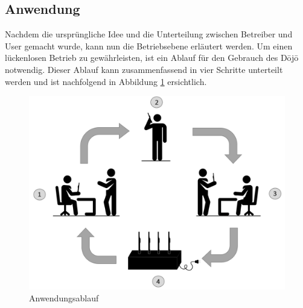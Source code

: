 \subsection{Anwendung}\label{sec:ladeablauf}
Nachdem die ursprüngliche Idee und die Unterteilung zwischen Betreiber und User gemacht wurde, kann nun die Betriebsebene erläutert werden.
Um einen lückenlosen Betrieb zu gewährleisten, ist ein Ablauf für den Gebrauch des Dōjō notwendig. Dieser Ablauf kann zusammenfassend in vier Schritte unterteilt werden und ist nachfolgend in Abbildung \ref{fig:Anwendungsablauf Dojo} ersichtlich.


\begin{figure}[H]
	\begin{center}
		\includegraphics[width=140mm]{data/Ladezyklus.png}
		\caption[Anwendungsablauf des Dojos]{Anwendungsablauf} %
		\label{fig:Anwendungsablauf Dojo}
	\end{center}
\end{figure}

